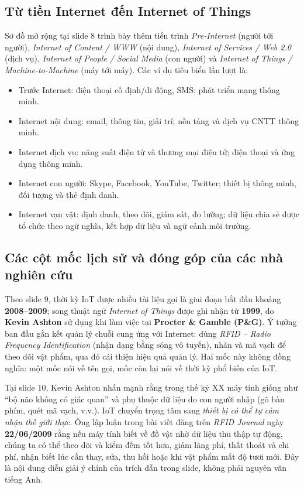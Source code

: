 \subsection{Từ tiền Internet đến Internet of Things}
Sơ đồ mở rộng tại slide 8 trình bày thêm tiến trình \emph{Pre-Internet} (người tới người), \emph{Internet of Content / WWW} (nội dung), \emph{Internet of Services / Web 2.0} (dịch vụ), \emph{Internet of People / Social Media} (con người) và \emph{Internet of Things / Machine-to-Machine} (máy tới máy). Các ví dụ tiêu biểu lần lượt là:
\begin{itemize}
\item Trước Internet: điện thoại cố định/di động, SMS; phát triển mạng thông minh.
\item Internet nội dung: email, thông tin, giải trí; nền tảng và dịch vụ CNTT thông minh.
\item Internet dịch vụ: năng suất điện tử và thương mại điện tử; điện thoại và ứng dụng thông minh.
\item Internet con người: Skype, Facebook, YouTube, Twitter; thiết bị thông minh, đối tượng và thẻ định danh.
\item Internet vạn vật: định danh, theo dõi, giám sát, đo lường; dữ liệu chia sẻ được tổ chức theo ngữ nghĩa, kết hợp dữ liệu và ngữ cảnh môi trường.
\end{itemize}

\subsection{Các cột mốc lịch sử và đóng góp của các nhà nghiên cứu}
Theo slide 9, thời kỳ IoT được nhiều tài liệu gọi là giai đoạn bắt đầu khoảng \textbf{2008--2009}; song thuật ngữ \emph{Internet of Things} được ghi nhận từ \textbf{1999}, do \textbf{Kevin Ashton} sử dụng khi làm việc tại \textbf{Procter \& Gamble (P\&G)}. Ý tưởng ban đầu gắn kết quản lý chuỗi cung ứng với Internet: dùng \emph{RFID -- Radio Frequency Identification} (nhận dạng bằng sóng vô tuyến), nhãn và mã vạch để theo dõi vật phẩm, qua đó cải thiện hiệu quả quản lý. Hai mốc này không đồng nghĩa: một mốc nói về tên gọi, mốc còn lại nói về thời kỳ phổ biến của IoT.

Tại slide 10, Kevin Ashton nhấn mạnh rằng trong thế kỷ XX máy tính giống như ``bộ não không có giác quan'' và phụ thuộc dữ liệu do con người nhập (gõ bàn phím, quét mã vạch, v.v.). IoT chuyển trọng tâm sang \emph{thiết bị có thể tự cảm nhận thế giới thực}. Ông lập luận trong bài viết đăng trên \emph{RFID Journal} ngày \textbf{22/06/2009} rằng nếu máy tính biết về đồ vật nhờ dữ liệu thu thập tự động, chúng ta có thể theo dõi và kiểm đếm tốt hơn, giảm lãng phí, thất thoát và chi phí, nhận biết lúc cần thay, sửa, thu hồi hoặc khi vật phẩm mất độ tươi mới. Đây là nội dung diễn giải ý chính của trích dẫn trong slide, không phải nguyên văn tiếng Anh.

